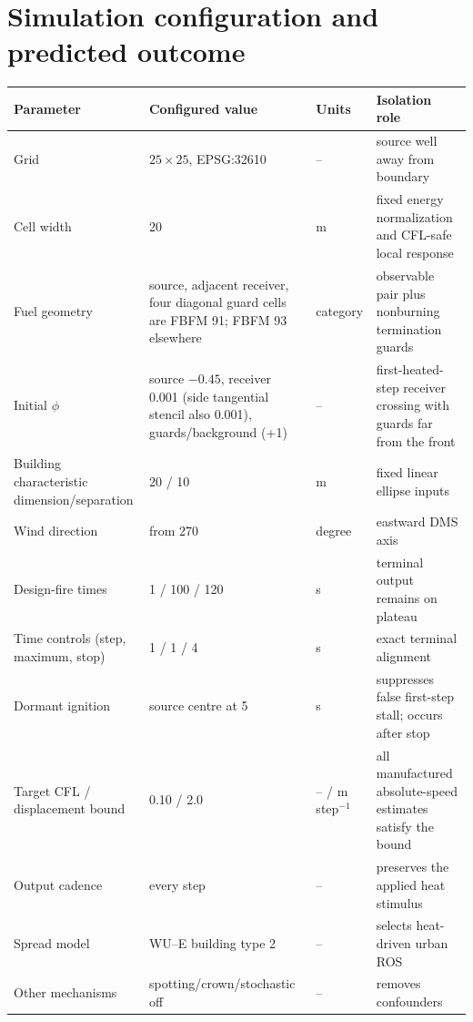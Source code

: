 \section{Simulation configuration and predicted outcome}

\begin{center}

\begin{longtable}{@{}P{0.17\textwidth}P{0.29\textwidth}P{0.10\textwidth}P{0.31\textwidth}@{}}\toprule
Parameter & Configured value & Units & Isolation role\\\midrule
Grid & \(25\times25\), EPSG:32610 & -- & source well away from boundary\\
Cell width & 20 & m & fixed energy normalization and CFL-safe local response\\
Fuel geometry & source, adjacent receiver, four diagonal guard cells are FBFM 91; FBFM 93 elsewhere & category & observable pair plus nonburning termination guards\\
Initial \(\phi\) & source \(-0.45\), receiver 0.001 (side tangential stencil also 0.001), guards/background (+1) & -- & first-heated-step receiver crossing with guards far from the front\\
Building characteristic dimension/separation & 20 / 10 & m & fixed linear ellipse inputs\\
Wind direction & from 270 & degree & eastward DMS axis\\
Design-fire times & 1 / 100 / 120 & s & terminal output remains on plateau\\
Time controls (step, maximum, stop) & 1 / 1 / 4 & s & exact terminal alignment\\
Dormant ignition & source centre at 5 & s & suppresses false first-step stall; occurs after stop\\
Target CFL / displacement bound & 0.10 / 2.0 & -- / m step\(^{-1}\) & all manufactured absolute-speed estimates satisfy the bound\\
Output cadence & every step & -- & preserves the applied heat stimulus\\
Spread model & WU--E building type 2 & -- & selects heat-driven urban ROS\\
Other mechanisms & spotting/crown/stochastic off & -- & removes confounders\\
\bottomrule\end{longtable}
\end{center}


